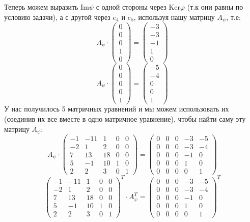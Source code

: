 \documentclass[a4paper,12pt]{article}
\begin{document}
Теперь можем выразить $\text{Im} \psi$ с одной стороны через $\text{Ker} \varphi$ (т.к они равны по условию задачи), а с другой через $e_4$ и $e_5$, используя нашу матрицу $A_{\psi}$, т.е:
\[
A_{\psi} \cdot \begin{pmatrix}
0 \\ 0 \\ 0 \\ 1 \\ 0
\end{pmatrix}
=
\begin{pmatrix}
-3 \\ -3 \\ -1 \\ 1 \\ 0 
\end{pmatrix}
\]
\[
A_{\psi} \cdot 
\begin{pmatrix}
0 \\ 0 \\ 0 \\ 0 \\ 1
\end{pmatrix}
=
\begin{pmatrix}
-5 \\ -4 \\ 0 \\ 0 \\ 1
\end{pmatrix}
\]
У нас получилось 5 матричных уравнений и мы можем использовать их (соединив их все вместе в одно матричное уравнение), чтобы найти саму эту матрицу $A_{\psi}$:
\[
A_{\psi}
\cdot
\left(\begin{matrix}
-1 & -11 & 1 & 0 & 0 \\
-2 & 1 & 2 & 0 & 0 \\
7 & 13 & 18 & 0 & 0 \\
5 & -1 & 10 & 1 & 0 \\
2 & 2 & 3 & 0 & 1
\end{matrix}\right)
=
\left(\begin{matrix}
0 & 0 & 0 & -3 & -5 \\
0 & 0 & 0 & -3 & -4 \\
0 & 0 & 0 & -1 & 0 \\
0 & 0 & 0 & 1 & 0 \\
0 & 0 & 0 & 0 & 1
\end{matrix}\right)
\]
\[
\left(\begin{matrix}
-1 & -11 & 1 & 0 & 0 \\
-2 & 1 & 2 & 0 & 0 \\
7 & 13 & 18 & 0 & 0 \\
5 & -1 & 10 & 1 & 0 \\
2 & 2 & 3 & 0 & 1
\end{matrix}\right)^T \cdot A_{\psi}^T= \left(\begin{matrix}
0 & 0 & 0 & -3 & -5 \\
0 & 0 & 0 & -3 & -4 \\
0 & 0 & 0 & -1 & 0 \\
0 & 0 & 0 & 1 & 0 \\
0 & 0 & 0 & 0 & 1
\end{matrix}\right)^T
\]
\end{document}
